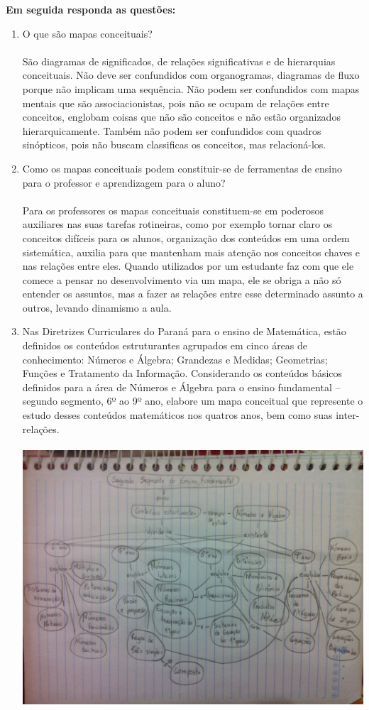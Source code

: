 \documentclass[a4paper, 12pt]{article}
\begin{document}
\begin{enumerate}
  \textbf{Em seguida responda as questões:}
  \begin{enumerate}
  \item O que são mapas conceituais?\\\\
    São diagramas de significados, de relações significativas e de hierarquias conceituais. Não deve ser confundidos com organogramas, diagramas de fluxo porque não implicam uma sequência. Não podem ser confundidos com mapas mentais que são associacionistas, pois não se ocupam de relações entre conceitos, englobam coisas que não são conceitos e não estão organizados hierarquicamente. Também não podem ser confundidos com quadros sinópticos, pois não buscam classificas os conceitos, mas relacioná-los.
  \item Como os mapas conceituais podem constituir-se de ferramentas de ensino para o professor e aprendizagem para o aluno?\\\\
    Para os professores os mapas conceituais constituem-se em poderosos auxiliares nas suas tarefas rotineiras, como por exemplo tornar claro os conceitos difíceis para os alunos, organização dos conteúdos em uma ordem sistemática, auxilia para que mantenham mais atenção nos conceitos chaves e nas relações entre eles. Quando utilizados por um estudante faz com que ele comece a pensar no desenvolvimento via um mapa, ele se obriga a não só entender os assuntos, mas a fazer as relações entre esse determinado assunto a outros, levando dinamismo a aula.
  \item Nas Diretrizes Curriculares do Paraná para o ensino de Matemática, estão definidos os conteúdos estruturantes agrupados em cinco áreas de conhecimento: Números e Álgebra; Grandezas e Medidas; Geometrias; Funções e Tratamento da Informação. Considerando os conteúdos básicos definidos para a área de Números e Álgebra para o ensino fundamental – segundo segmento, 6º ao 9º ano, elabore um mapa conceitual que represente o estudo desses conteúdos matemáticos nos quatros anos, bem como suas inter-relações. \\\\
      \includegraphics[width=1\textwidth]{1}

  \end{enumerate}   
\end{enumerate}
\end{document}
